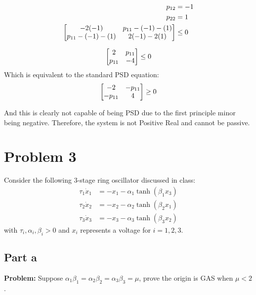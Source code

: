 \documentclass[letter]{article}
\begin{document}
\begin{align}
	p_{12} &= -1\\
	p_{22} &= 1\\
	\mqty[-2(-1) & p_{11} - (-1) - (1)\\ p_{11} - (-1) - (1) & 2 (-1) - 2 (1)] &\leq 0
\end{align}

\begin{align}
	\mqty[2 & p_{11}\\ p_{11}& -4] \leq 0
\end{align}
Which is equivalent to the standard PSD equation: 
\begin{align}
	\mqty[-2 & -p_{11}\\ -p_{11}& 4] \geq 0
\end{align}

And this is clearly not capable of being PSD due to the first principle minor being negative. Therefore, the system is not Positive Real and cannot be passive.

\newpage
\section{Problem 3}
Consider the following 3-stage ring oscillator discussed in class:
\begin{align*}
	\tau_1 \dot{x}_1 &= -x_1 - \alpha_1 \tanh(\beta_1 x_3)\\
	\tau_2 \dot{x}_2 &= -x_2 - \alpha_2 \tanh(\beta_2 x_1)\\
	\tau_3 \dot{x}_3 &= -x_3 - \alpha_3 \tanh(\beta_3 x_2)
\end{align*}
with $\tau_i, \alpha_i, \beta_i > 0$ and $x_i$ represents a voltage for $i = 1,2,3$.

\subsection{Part a}
\textbf{Problem:}
Suppose $\alpha_1 \beta_1 = \alpha_2 \beta_2 = \alpha_3 \beta_3 = \mu$, prove the origin is GAS when $\mu < 2$.\\
\end{document}
